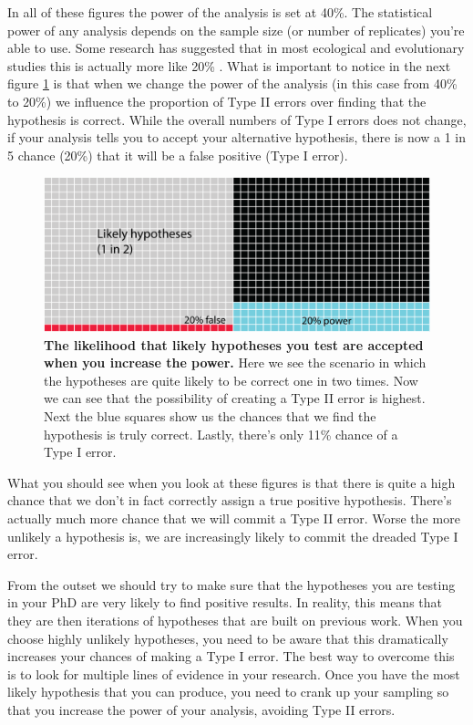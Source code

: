 \documentclass[
]{krantz}
\begin{document}
In all of these figures the power of the analysis is set at 40\%. The statistical power of any analysis depends on the sample size (or number of replicates) you're able to use. Some research has suggested that in most ecological and evolutionary studies this is actually more like 20\% \citep[see references in][]{forstmeier2017detecting}. What is important to notice in the next figure \ref{fig:20PowerHyp} is that when we change the power of the analysis (in this case from 40\% to 20\%) we influence the proportion of Type II errors over finding that the hypothesis is correct. While the overall numbers of Type I errors does not change, if your analysis tells you to accept your alternative hypothesis, there is now a 1 in 5 chance (20\%) that it will be a false positive (Type I error).



\begin{figure}
\includegraphics[width=0.9\linewidth]{figures/20PowerHyp} \caption{\textbf{The likelihood that likely hypotheses you test are accepted when you increase the power.} Here we see the scenario in which the hypotheses are quite likely to be correct one in two times. Now we can see that the possibility of creating a Type II error is highest. Next the blue squares show us the chances that we find the hypothesis is truly correct. Lastly, there's only 11\% chance of a Type I error.}\label{fig:20PowerHyp}
\end{figure}

What you should see when you look at these figures is that there is quite a high chance that we don't in fact correctly assign a true positive hypothesis. There's actually much more chance that we will commit a Type II error. Worse the more unlikely a hypothesis is, we are increasingly likely to commit the dreaded Type I error.

From the outset we should try to make sure that the hypotheses you are testing in your PhD are very likely to find positive results. In reality, this means that they are then iterations of hypotheses that are built on previous work. When you choose highly unlikely hypotheses, you need to be aware that this dramatically increases your chances of making a Type I error. The best way to overcome this is to look for multiple lines of evidence in your research. Once you have the most likely hypothesis that you can produce, you need to crank up your sampling so that you increase the power of your analysis, avoiding Type II errors.
\end{document}
